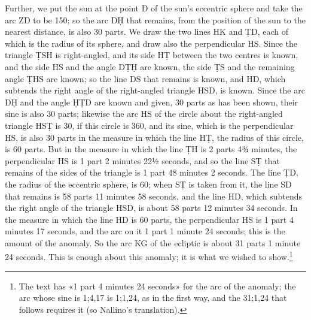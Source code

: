 \documentclass[11pt]{article}
\newcommand{\ArPage}[1]{\marginpar{\footnotesize\color{gray}Ar.\,p.\,#1}}
\begin{document}
\par \ArPage{72}Further, we put the sun at the point D of the sun's eccentric sphere and take the arc ZD to be 150; so the arc DḤ that remains, from the position of the sun to the nearest distance, is also 30 parts. We draw the two lines HK and ṬD, each of which is the radius of its sphere, and draw also the perpendicular HS. Since the triangle ṬSH is right-angled, and its side HṬ between the two centres is known, and the side HS and the angle DṬḤ are known, the side ṬS and the remaining angle ṬHS are known; so the line DS that remains is known, and HD, which subtends the right angle of the right-angled triangle HSD, is known. Since the arc DḤ and the angle ḤṬD are known and given, 30 parts as has been shown, their sine is also 30 parts; likewise the arc HS of the circle about the right-angled triangle HSṬ is 30, if this circle is 360, and its sine, which is the perpendicular HS, is also 30 parts in the measure in which the line HṬ, the radius of this circle, is 60 parts. But in the measure in which the line ṬH is 2 parts 4¾ minutes, the perpendicular HS is 1 part 2 minutes 22½ seconds, and so the line SṬ that remains of the sides of the triangle is 1 part 48 minutes 2 seconds. The line ṬD, the radius of the eccentric sphere, is 60; when SṬ is taken from it, the line SD that remains is 58 parts 11 minutes 58 seconds, and the line HD, which subtends the right angle of the triangle HSD, is about 58 parts 12 minutes 34 seconds. In the measure in which the line HD is 60 parts, the perpendicular HS is 1 part 4 minutes 17 seconds, and the arc on it 1 part 1 minute 24 seconds; this is the amount of the anomaly. So the arc KG of the ecliptic is about 31 parts 1 minute 24 seconds. This is enough about this anomaly; it is what we wished to show.\footnote{The text has «1 part 4 minutes 24 seconds» for the arc of the anomaly; the arc whose sine is 1;4,17 is 1;1,24, as in the first way, and the 31;1,24 that follows requires it (so Nallino's translation).}\par
\end{document}

